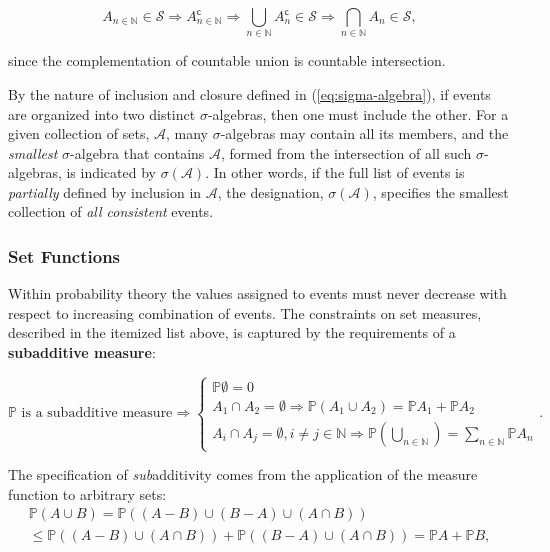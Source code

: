 \documentclass[12pt, twoside, draft]{article}
\begin{document}
\begin{equation}
A_{n\in\mathbb{N}} \in \mathcal{S} \Rightarrow A_{n\in\mathbb{N}}^{\mathsf{c}} \Rightarrow \bigcup_{n\in \mathbb{N}} A^{\mathsf{c}}_n \in \mathcal{S} \Rightarrow \bigcap_{n\in \mathbb{N}} A_n \in \mathcal{S},
\end{equation}

since the complementation of countable union is countable intersection.

By the nature of inclusion and closure defined in (\ref{eq:sigma-algebra}), if events are organized into two distinct $\sigma$-algebras, then one must include the other.  For a given collection of sets, $\mathcal{A}$, many $\sigma$-algebras may contain all its members, and the \textit{smallest} $\sigma$-algebra that contains $\mathcal{A}$, formed from the intersection of all such $\sigma$-algebras, is indicated by $\sigma(\mathcal{A})$.  In other words, if the full list of events is \textit{partially} defined by inclusion in $\mathcal{A}$, the designation, $\sigma(\mathcal{A})$, specifies the smallest collection of \textit{all consistent} events.

\subsubsection{Set Functions}\label{sec:set_functions}

Within probability theory the values assigned to events must never decrease with respect to increasing combination of events.  The constraints on set measures, described in the itemized list above, is captured by the requirements of a \textbf{subadditive measure}:

\begin{equation}\label{eq:subadditive_measure}
\mathbb{P} \text{ is a subadditive measure} \Rightarrow
\begin{cases}
\mathbb{P}\emptyset = 0 \\
A_1 \cap A_2 = \emptyset \Rightarrow \mathbb{P} (A_1 \cup A_2)= \mathbb{P}A_1 + \mathbb{P}A_2 \\
A_i \cap A_j = \emptyset, i \neq j \in \mathbb{N} \Rightarrow \mathbb{P}(\bigcup_{n\in\mathbb{N}}) = \sum_{n\in\mathbb{N}} \mathbb{P}A_n
\end{cases}.
\end{equation}

The specification of \textit{sub}additivity comes from the application of the measure function to arbitrary sets: 
\begin{multline}
\mathbb{P}(A \cup B) = \mathbb{P} ((A - B) \cup (B - A) \cup (A\cap B)) \\
\leq \mathbb{P}((A - B) \cup (A \cap B)) + \mathbb{P}((B - A) \cup (A \cap B)) = \mathbb{P}A + \mathbb{P}B, 
\end{multline}
\end{document}
